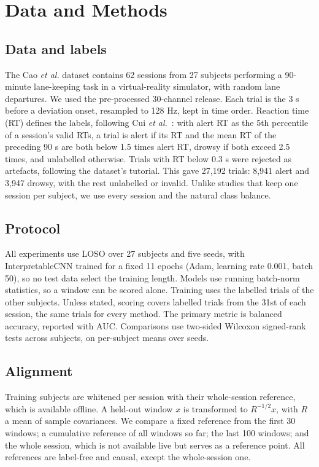 \section{Data and Methods}
\label{sec:methods}

\subsection{Data and labels}
The Cao \textit{et al.} dataset \cite{cao2019multichannel} contains 62 sessions from 27 subjects performing a 90-minute lane-keeping task in a virtual-reality simulator, with random lane departures. We used the pre-processed 30-channel release. Each trial is the 3 s before a deviation onset, resampled to 128 Hz, kept in time order. Reaction time (RT) defines the labels, following Cui \textit{et al.}~\cite{cui2022eeg}: with alert RT as the 5th percentile of a session's valid RTs, a trial is alert if its RT and the mean RT of the preceding 90 s are both below 1.5 times alert RT, drowsy if both exceed 2.5 times, and unlabelled otherwise. Trials with RT below 0.3 s were rejected as artefacts, following the dataset's tutorial. This gave 27{,}192 trials: 8{,}941 alert and 3{,}947 drowsy, with the rest unlabelled or invalid. Unlike studies that keep one session per subject, we use every session and the natural class balance.

\subsection{Protocol}
All experiments use LOSO over 27 subjects and five seeds, with InterpretableCNN \cite{cui2022eeg} trained for a fixed 11 epochs (Adam, learning rate 0.001, batch 50), so no test data select the training length. Models use running batch-norm statistics, so a window can be scored alone. Training uses the labelled trials of the other subjects. Unless stated, scoring covers labelled trials from the 31st of each session, the same trials for every method. The primary metric is balanced accuracy, reported with AUC. Comparisons use two-sided Wilcoxon signed-rank tests across subjects, on per-subject means over seeds.

\subsection{Alignment}
Training subjects are whitened per session with their whole-session reference, which is available offline. A held-out window $x$ is transformed to $R^{-1/2}x$, with $R$ a mean of sample covariances. We compare a fixed reference from the first 30 windows; a cumulative reference of all windows so far; the last 100 windows; and the whole session, which is not available live but serves as a reference point. All references are label-free and causal, except the whole-session one.

